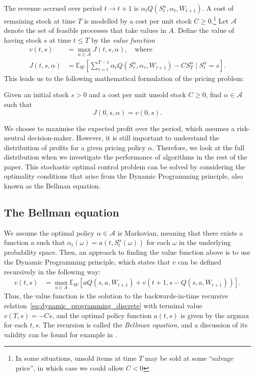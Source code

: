 \documentclass[main.tex]{subfiles}
\begin{document}
The revenue accrued over period $t\to t+1$ is $\alpha_tQ(S_t^\alpha,\alpha_t,W_{t+1})$.
A cost of remaining stock at time $T$ is modelled by a cost per unit
stock $C\geq 0$.\footnote{In some situations, unsold items at time $T$
  may be sold at some ``salvage price'', in which case we could allow
  $C<0$}
Let $\mathcal A$ denote the set of feasible processes that take values
in $A$.
Define the value of having stock $s$ at time $t\leq T$
by the \emph{value function}
\begin{align}\label{eq:value_function_def}
  v(t,s)&=\max_{\alpha\in\mathcal A} J(t,s,\alpha),\quad\text{where}\\
  J(t,s,\alpha)&=
                 \mathbb E_{W}\left[ \sum_{\tau=t}^{T-1}
                 \alpha_tQ(S_\tau^\alpha,\alpha_\tau,W_{\tau+1})
                 - CS_T^\alpha \mid S_t^\alpha = s
                 \right].
                 \label{eq:value_function_def2}
\end{align}
This leads us to the following mathematical formulation of the pricing
problem:
\begin{mydef}
  Given an initial stock $s>0$ and a cost per unit unsold stock $C\geq
  0$, find $\alpha\in\mathcal A$ such that
  \begin{equation}
    J(0,s,\alpha) = v(0,s).
  \end{equation}
\end{mydef}
We choose to maximise the expected profit over the period, which
assumes a risk-neutral decision-maker. However, it is still important
to understand the distribution of profits for a given pricing policy
$\alpha$. Therefore, we look at the full distribution when
we investigate the performance of algorithms in the rest of the paper.
This stochastic optimal control problem can be solved by
considering the optimality conditions that arise from the Dynamic
Programming principle, also known as the Bellman equation.

\subsection{The Bellman equation}
We assume the optimal policy $\alpha\in\mathcal A$ is Markovian,
meaning that
there exists a function $a$ such that $\alpha_t(\omega) =
a(t,S_t^\alpha(\omega))$ for each $\omega$ in the underlying probability space.
Then,
an approach to finding the value function above is to use the Dynamic
Programming principle, which states that $v$ can be defined
recursively in the following way:
\begin{align}\label{eq:dynamic_programming_discrete}
  v(t,s)&=\max_{a\in A}\mathbb E_{W}\left[
          aQ(s,a,W_{t+1})
          +v(t+1,s-Q(s,a,W_{t+1}))\right].
\end{align}
Thus, the value function is the solution to the backwards-in-time
recursive relation~\eqref{eq:dynamic_programming_discrete} with
terminal value $v(T,s)=-Cs$, and the optimal policy
function $a(t,s)$ is given by the argmax for each $t,s$.
The recursion is called the \emph{Bellman equation}, and a discussion
of its validity can be found for example in \citet{bertsekas2005dynamic}.
\end{document}
